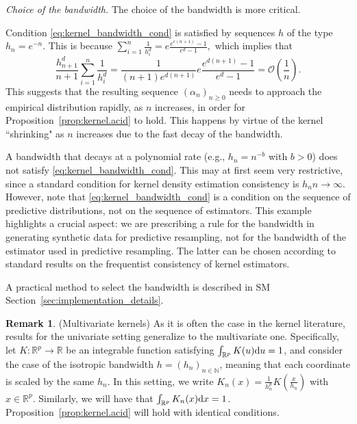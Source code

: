 \documentclass{article}
\theoremstyle{definition}
\newtheorem{remark}{Remark}
\newcommand{\red}[1]{\textcolor{red}{#1}}
\newcommand{\di}{{\rm d}}
\renewcommand{\&}{and}
\begin{document}
\textit{Choice of the bandwidth.} The choice of the bandwidth is more critical. 

Condition \eqref{eq:kernel_bandwidth_cond} is satisfied by sequences $h$ of the type $h_n=e^{-n}$. This is because 
$\sum_{i=1}^n \frac{1}{h_i^d}= e \frac{e^{\epsilon(n+1)}-1}{e^d -1},$
which implies that 
\[
\frac{h_{n+1}^d}{n+1} \sum_{i=1}^{n} \frac{1}{h_i^d} = \frac{1}{(n+1)e^{d(n+1)}}e \frac{e^{d(n+1)}-1}{e^d -1}=\mathcal{O}\left(\frac{1}{n}\right).
\]
This suggests that the resulting sequence $(\alpha_n)_{n \geq 0}$ needs to approach the empirical distribution rapidly, as $n$ increases, %
in order for Proposition~\ref{prop:kernel.acid} to hold. This happens by virtue of the kernel ``shrinking" as $n$ increases due to the fast decay of the bandwidth. %


A bandwidth that decays at a polynomial rate (e.g., $h_n = n^{-b}$ with $b>0$) does not satisfy \eqref{eq:kernel_bandwidth_cond}. This may at first seem very restrictive, since a standard condition for kernel density estimation consistency is $h_n n \to \infty$. However, note that \eqref{eq:kernel_bandwidth_cond} is a condition on the sequence of predictive distributions, not on the sequence of estimators. This example highlights a crucial aspect: we are prescribing a rule for the bandwidth in generating synthetic data for predictive resampling, not for the bandwidth of the estimator used in predictive resampling. The latter can be chosen according to standard results on the frequentist consistency of kernel estimators.

A practical method to select the bandwidth is described in SM Section~\ref{sec:implementation_details}.


\begin{remark}\label{rmk:multi} (Multivariate kernels) As it is often the case in the kernel literature, results for the univariate setting generalize to the multivariate one. Specifically, let $K:\mathbb{R}^p\to \mathbb{R}$ be an integrable function satisfying $\int_{\mathbb{R}^p}K(u)\di u=1$, and consider the case of the isotropic bandwidth $h=(h_{n})_{n\in \mathbb{N}}$, meaning that each coordinate is scaled by the same $h_n$. In this setting, we write $K_n (x)= \frac{1}{h_n^p} K(\frac{x}{h_n})$ with $x\in \mathbb{R}^p$. Similarly, we will have that $\int_{\mathbb{R}^p} K_n (x) \di x=1$. Proposition~\ref{prop:kernel.acid} will hold with identical conditions. 
\end{remark}
\end{document}
